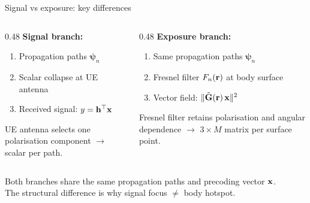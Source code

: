 \begin{frame}{Signal vs exposure: key differences}

  \begin{columns}[T]
    \begin{column}{0.48\textwidth}
      \textbf{Signal branch:}
      \begin{enumerate}
        \item Propagation paths $\bm{\psi}_n$
        \item Scalar collapse at UE antenna
        \item Received signal: $y = \mathbf{h}^\top \mathbf{x}$
      \end{enumerate}

      \vspace{4pt}
      {\footnotesize UE antenna selects one polarisation component $\rightarrow$ scalar per path.}
    \end{column}

    \begin{column}{0.48\textwidth}
      \textbf{Exposure branch:}
      \begin{enumerate}
        \item Same propagation paths $\bm{\psi}_n$
        \item Fresnel filter $F_n(\mathbf{r})$ at body surface
        \item Vector field: $\|\tilde{\mathbf{G}}(\mathbf{r})\,\mathbf{x}\|^2$
      \end{enumerate}

      \vspace{4pt}
      {\footnotesize Fresnel filter retains polarisation and angular dependence $\rightarrow$ $3 \times M$ matrix per surface point.}
    \end{column}
  \end{columns}

  \vspace{8pt}
  Both branches share the same propagation paths and precoding vector $\mathbf{x}$.\\
  The structural difference is why signal focus $\neq$ body hotspot.

  \vspace{4pt}
  \quad{}
\end{frame}

